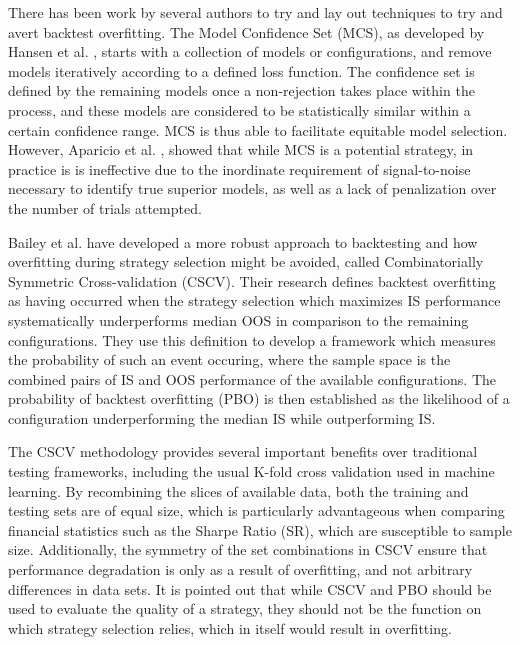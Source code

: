 \documentclass[a4paper,latin]{paper}
\begin{document}
There has been work by several authors to try and lay out techniques to try and avert backtest overfitting. 
The Model Confidence Set (MCS), as developed by Hansen et al. \cite{Hansen}, starts with a 
collection of models or configurations, and remove models iteratively according to a defined loss function. 
The confidence set is defined by the remaining models once a non-rejection takes place within the process, and 
these models are considered to be statistically similar within a certain confidence range. MCS is thus able to facilitate 
equitable model selection. However, Aparicio et al. \cite{Aparicio}, showed  that while MCS is a potential strategy, in 
practice is is ineffective due to the inordinate requirement of signal-to-noise necessary to identify true superior 
models, as well as a lack of penalization over the number of trials attempted.
\hfill \break

Bailey et al. \cite{BailyPBO} have developed a more robust approach to backtesting and how overfitting during strategy 
selection might be avoided, called Combinatorially Symmetric Cross-validation (CSCV). Their research defines backtest overfitting as having occurred when the strategy selection which maximizes IS performance systematically underperforms median OOS in comparison to the remaining configurations. They use this definition to develop a framework which measures the probability of such an event occuring, where the sample space is the combined pairs of IS and OOS performance of the available configurations. The probability of backtest overfitting (PBO) is then established as the likelihood of a configuration underperforming the median IS while outperforming IS. 
\hfill \break 

The CSCV methodology provides several important benefits over traditional testing 
frameworks, including the usual K-fold cross validation used in machine learning. By recombining the slices of 
available data, both the training and testing sets are of equal size, which is particularly advantageous when comparing 
financial statistics such as the Sharpe Ratio (SR), which are susceptible to sample size. Additionally, the symmetry 
of the set combinations in CSCV ensure that performance degradation is only as a result of overfitting, and not 
arbitrary differences in data sets. It is pointed out that while CSCV and PBO should be used to evaluate the quality 
of a strategy, they should not be the function on which strategy selection relies, which in itself would result in overfitting.
\hfill \break 
\end{document}
